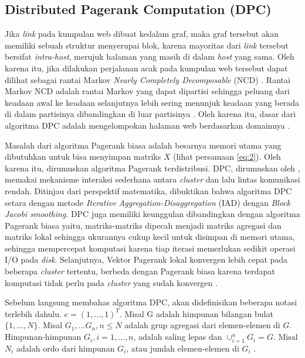 \documentclass[
	a4paper, %
	12pt, %
	unnumberedsections, %
	twoside, %
]{LTJournalArticle}
\begin{document}
\subsection{Distributed Pagerank Computation (DPC)}

Jika \textit{link} pada kumpulan web dibuat kedalam graf, maka graf tersebut akan memiliki sebuah struktur menyerupai blok, karena mayoritas dari \textit{link} tersebut bersifat \textit{intra-host}, merujuk halaman yang masih di dalam \textit{host} yang sama. Oleh karena itu, jika dilakukan perjalanan acak pada kumpulan web tersebut dapat dilihat sebagai rantai Markov \textit{Nearly Completely Decomposable} (NCD) \citep{zhuetal2005distributedPagerank}. Rantai Markov NCD adalah rantai Markov yang dapat dipartisi sehingga peluang dari keadaan awal ke keadaan selanjutnya lebih sering menunjuk keadaan yang berada di dalam partisinya dibandingkan di luar partisinya \citep{kontovasilisMitrou1995}. Oleh karena itu, dasar dari algoritma DPC adalah mengelompokan halaman web berdasarkan domainnya \citep{zhuetal2005distributedPagerank}.

Masalah dari algoritma Pagerank biasa adalah besarnya memori utama yang dibutuhkan untuk bisa menyimpan matriks $X$ (lihat persamaan \ref{eq:2}). Oleh karena itu, dirumuskan algoritma Pagerank terdistribusi. DPC, dirumuskan oleh \citet{zhuetal2005distributedPagerank}, memakai mekanisme interaksi sederhana antara \textit{cluster} dan lalu lintas komunikasi rendah. Ditinjau dari perspektif matematika, dibuktikan bahwa algoritma DPC setara dengan metode \textit{Iterative Aggregation-Disaggregation} (IAD) dengan \textit{Block Jacobi smoothing}. DPC juga memiliki keunggulan dibandingkan dengan algoritma Pagerank biasa yaitu, matriks-matriks dipecah menjadi matriks agregasi dan matriks lokal sehingga ukurannya cukup kecil untuk disimpan di memori utama, sehingga mempercepat komputasi karena tiap iterasi memerlukan sedikit operasi I/O pada \textit{disk}. Selanjutnya, Vektor Pagerank lokal konvergen lebih cepat pada beberapa \textit{cluster} tertentu, berbeda dengan Pagerank biasa karena terdapat komputasi tidak perlu pada \textit{cluster} yang sudah konvergen \citep{zhuetal2005distributedPagerank}.

Sebelum langsung membahas algoritma DPC, akan didefinisikan beberapa notasi terlebih dahulu. $e=(1,...,1)^T$. Misal G adalah himpunan bilangan bulat $\{1,...,N\}$. Misal $G_1,...G_n, n \leq N$ adalah grup agregasi dari elemen-elemen di $G$. Himpunan-himpunan $G_i, i = 1,...,n$, adalah saling lepas dan $\cup^n_{i=1}G_i=G$. Misal $N_i$ adalah ordo dari himpunan $G_i$, atau jumlah elemen-elemen di $G_i$ \citep{zhuetal2005distributedPagerank}. 
\end{document}
